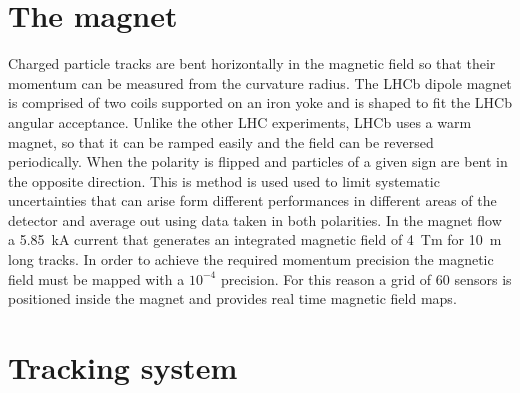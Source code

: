 \section{The magnet}

Charged particle tracks are bent horizontally in the magnetic field
so that their momentum can be measured from the curvature radius.
The LHCb dipole magnet is comprised of two coils supported on an iron yoke
and is shaped to fit the LHCb angular acceptance. Unlike the other LHC experiments,
LHCb uses a warm magnet, so that it can be ramped easily and the field can be reversed periodically.
When the polarity is flipped and particles of a given sign are bent in the opposite direction. 
This is method is used used to limit systematic uncertainties that can arise form different performances
in different areas of the detector and average out using data taken in both polarities.
In the magnet flow a 5.85~kA current that generates an integrated magnetic field of 4~Tm for 10~m long tracks.
In order to achieve the required momentum precision the magnetic field must be mapped with
a $10^{-4}$ precision. For this reason a grid of 60 sensors is positioned inside the magnet
and provides real time magnetic field maps.

\section{Tracking system}

